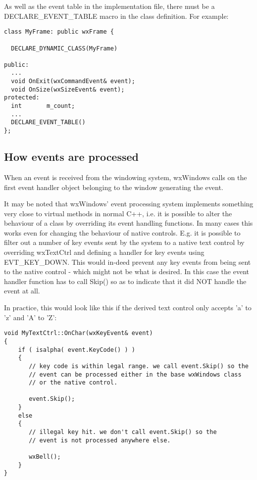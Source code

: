 As well as the event table in the implementation file, there must be a DECLARE\_EVENT\_TABLE
macro in the class definition. For example:

{\small%
\begin{verbatim}
class MyFrame: public wxFrame {

  DECLARE_DYNAMIC_CLASS(MyFrame)

public:
  ...
  void OnExit(wxCommandEvent& event);
  void OnSize(wxSizeEvent& event);
protected:
  int       m_count;
  ...
  DECLARE_EVENT_TABLE()
};
\end{verbatim}
}%

\subsection{How events are processed}\label{eventprocessing}

When an event is received from the windowing system, wxWindows calls  on
the first event handler object belonging to the window generating the event.

It may be noted that wxWindows' event processing system implements something
very close to virtual methods in normal C++, i.e. it is possible to alter
the behaviour of a class by overriding its event handling functions. In
many cases this works even for changing the behaviour of native controls.
E.g. it is possible to filter out a number of key events sent by the
system to a native text control by overriding wxTextCtrl and defining a
handler for key events using EVT_KEY_DOWN. This would in-deed prevent
any key events from being sent to the native control - which might not be
what is desired. In this case the event handler function has to call Skip()
so as to indicate that it did NOT handle the event at all.

In practice, this would look like this if the derived text control only
accepts 'a' to 'z' and 'A' to 'Z':

{\small%
\begin{verbatim}
void MyTextCtrl::OnChar(wxKeyEvent& event)
{
    if ( isalpha( event.KeyCode() ) )
    {
       // key code is within legal range. we call event.Skip() so the
       // event can be processed either in the base wxWindows class
       // or the native control.
       
       event.Skip(); 
    }
    else
    {
       // illegal key hit. we don't call event.Skip() so the
       // event is not processed anywhere else.
       
       wxBell();
    }
}

\end{verbatim}
}%


